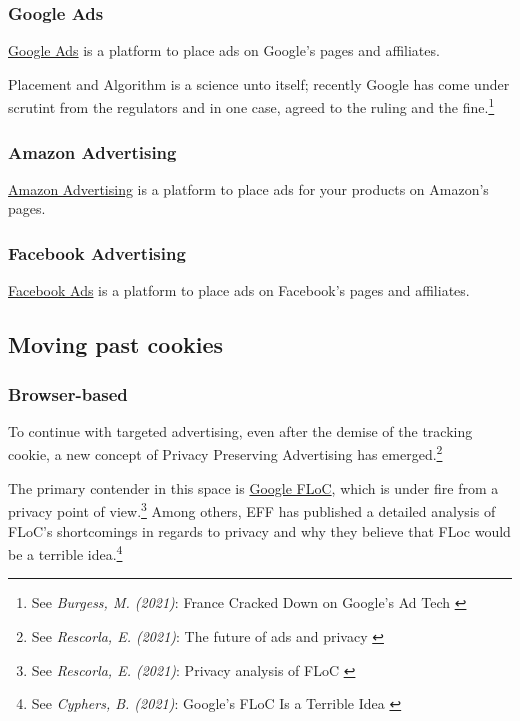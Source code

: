 \subsubsection{Google Ads}

\href{https://ads.google.com/home/}{Google Ads} is a platform to place ads on Google's pages and affiliates.

Placement and Algorithm is a science unto itself; recently Google has come under scrutint from the regulators and in one case, agreed to the ruling and the fine.\footnote{See \textit{Burgess, M. (2021)}: France Cracked Down on Google’s Ad Tech \cite{googleAds}}

\subsubsection{Amazon Advertising}

\href{https://advertising.amazon.com//}{Amazon Advertising} is a platform to place ads for your products on Amazon's pages.

\subsubsection{Facebook Advertising}

\href{https://www.facebook.com/business/ads}{Facebook Ads} is a platform to place ads on Facebook's pages and affiliates.

\subsection{Moving past cookies}

\subsubsection{Browser-based}

To continue with targeted advertising, even after the demise of the tracking cookie, a new concept of Privacy Preserving Advertising has emerged.\footnote{See \textit{Rescorla, E. (2021)}: The future of ads and privacy \cite{futureAds}}

The primary contender in this space is \href{https://wicg.github.io/floc/}{Google FLoC}, which is under fire from a privacy point of view.\footnote{See \textit{Rescorla, E. (2021)}: Privacy analysis of FLoC \cite{privacyFloc}} Among others, EFF has published a detailed analysis of FLoC's shortcomings in regards to privacy and why they believe that FLoc would be a terrible idea.\footnote{See \textit{Cyphers, B. (2021)}: Google’s FLoC Is a Terrible Idea \cite{terribleIdea}}

